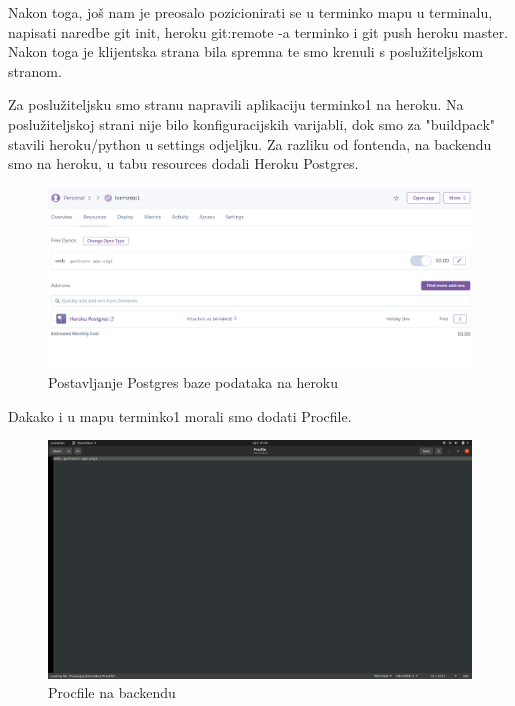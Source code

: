 			Nakon toga, još nam je preosalo pozicionirati se u terminko mapu u terminalu, napisati naredbe git init, heroku git:remote -a terminko i git push heroku master. Nakon toga je klijentska strana bila spremna te smo krenuli s poslužiteljskom stranom.
			
			Za poslužiteljsku smo stranu napravili aplikaciju terminko1 na heroku. Na poslužiteljskoj strani nije bilo konfiguracijskih varijabli, dok smo za "buildpack" stavili heroku/python u settings odjeljku. Za razliku od fontenda, na backendu smo na heroku, u tabu resources dodali Heroku Postgres.
			
			\begin{figure}[H]
				\centering
				\includegraphics[scale=0.50]{slike/Postgres.PNG}
				\caption{Postavljanje Postgres baze podataka na heroku}
				\label{fig:promjene}
			\end{figure}
		
			Dakako i u mapu terminko1 morali smo dodati Procfile.
			
			\begin{figure}[H]
				\centering
				\includegraphics[scale=0.25]{slike/ProcFileBackend.PNG}
				\caption{Procfile na backendu}
				\label{fig:promjene}
			\end{figure}
		
